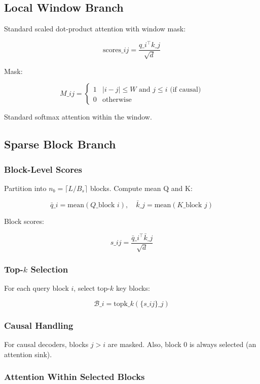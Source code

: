 \subsection{Local Window Branch}

Standard scaled dot-product attention with window mask:

\[
\text{scores}\_{ij} = \frac{q\_i^\top k\_j}{\sqrt{d}}
\tag{4.1}
\]

Mask:

\[
M\_{ij} = \begin{cases} 1 & |i - j| \leq W \text{ and } j \leq i \text{ (if causal)} \\ 0 & \text{otherwise} \end{cases}
\tag{4.2}
\]

Standard softmax attention within the window.

\subsection{Sparse Block Branch}

\subsubsection{Block-Level Scores}

Partition into $n_b = \lceil L / B_s \rceil$ blocks. Compute mean Q and K:

\[
\bar{q}\_i = \text{mean}(Q\_{\text{block } i}), \quad
\bar{k}\_j = \text{mean}(K\_{\text{block } j})
\tag{4.3}
\]

Block scores:

\[
s\_{ij} = \frac{\bar{q}\_i^\top \bar{k}\_j}{\sqrt{d}}
\tag{4.4}
\]

\subsubsection{Top-$k$ Selection}

For each query block $i$, select top-$k$ key blocks:

\[
\mathcal{B}\_i = \text{topk}\_{k}(\{s\_{ij}\}\_j)
\tag{4.5}
\]

\subsubsection{Causal Handling}

For causal decoders, blocks $j > i$ are masked. Also, block 0 is always 
selected (an attention sink).

\subsubsection{Attention Within Selected Blocks}

